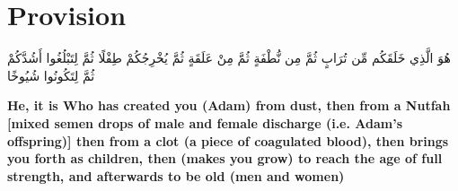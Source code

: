 \chapter{Provision}
\begin{center}
    {\Huge    
        \begin{Arabic}
            هُوَ الَّذِي خَلَقَكُم مِّن تُرَابٍ ثُمَّ مِن نُّطْفَةٍ ثُمَّ مِنْ عَلَقَةٍ ثُمَّ يُخْرِجُكُمْ طِفْلًا ثُمَّ لِتَبْلُغُوا أَشُدَّكُمْ ثُمَّ لِتَكُونُوا شُيُوخًا
        \end{Arabic}
    }
\end{center}
\vspace*{\fill}
\vspace{3cm}
\begin{center}
    \large \textbf{He, it is Who has created you (Adam) from dust, then from a Nutfah [mixed semen drops of male and female discharge (i.e. Adam's offspring)] then from a clot (a piece of coagulated blood), then brings you forth as children, then (makes you grow) to reach the age of full strength, and afterwards to be old (men and women)}
\end{center}
